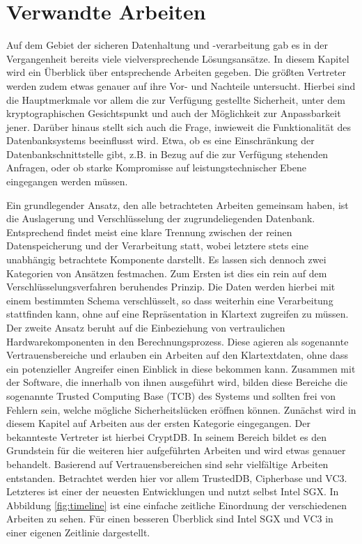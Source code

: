 \section{Verwandte Arbeiten}
Auf dem Gebiet der sicheren Datenhaltung und -verarbeitung gab es in der Vergangenheit bereits viele vielversprechende Lösungsansätze. In diesem Kapitel wird ein Überblick über entsprechende Arbeiten gegeben. Die größten Vertreter werden zudem etwas genauer auf ihre Vor- und Nachteile untersucht. Hierbei sind die Hauptmerkmale vor allem die zur Verfügung gestellte Sicherheit, unter dem kryptographischen Gesichtspunkt und auch der Möglichkeit zur Anpassbarkeit jener. Darüber hinaus stellt sich auch die Frage, inwieweit die Funktionalität des Datenbanksystems beeinflusst wird. Etwa, ob es eine Einschränkung der Datenbankschnittstelle gibt, z.B. in Bezug auf die zur Verfügung stehenden Anfragen, oder ob starke Kompromisse auf leistungstechnischer Ebene eingegangen werden müssen.

Ein grundlegender Ansatz, den alle betrachteten Arbeiten gemeinsam haben, ist die Auslagerung und Verschlüsselung der zugrundeliegenden Datenbank. Entsprechend findet meist eine klare Trennung zwischen der reinen Datenspeicherung und der Verarbeitung statt, wobei letztere stets eine unabhängig betrachtete Komponente darstellt. Es lassen sich dennoch zwei Kategorien von Ansätzen festmachen. Zum Ersten ist dies ein rein auf dem Verschlüsselungsverfahren beruhendes Prinzip. Die Daten werden hierbei mit einem bestimmten Schema verschlüsselt, so dass weiterhin eine Verarbeitung stattfinden kann, ohne auf eine Repräsentation in Klartext zugreifen zu müssen. Der zweite Ansatz beruht auf die Einbeziehung von vertraulichen Hardwarekomponenten in den Berechnungsprozess. Diese agieren als sogenannte Vertrauensbereiche und erlauben ein Arbeiten auf den Klartextdaten, ohne dass ein potenzieller Angreifer einen Einblick in diese bekommen kann. Zusammen mit der Software, die innerhalb von ihnen ausgeführt wird, bilden diese Bereiche die sogenannte Trusted Computing Base (TCB) des Systems und sollten frei von Fehlern sein, welche mögliche Sicherheitslücken eröffnen können.
Zunächst wird in diesem Kapitel auf Arbeiten aus der ersten Kategorie eingegangen. Der bekannteste Vertreter ist hierbei CryptDB. In seinem Bereich bildet es den Grundstein für die weiteren hier aufgeführten Arbeiten und wird etwas genauer behandelt. Basierend auf Vertrauensbereichen sind sehr vielfältige Arbeiten entstanden. Betrachtet werden hier vor allem TrustedDB, Cipherbase und VC3. Letzteres ist einer der neuesten Entwicklungen und nutzt selbst Intel SGX. In Abbildung \ref{fig:timeline} ist eine einfache zeitliche Einordnung der verschiedenen Arbeiten zu sehen. Für einen besseren Überblick sind Intel SGX und VC3 in einer eigenen Zeitlinie dargestellt.

